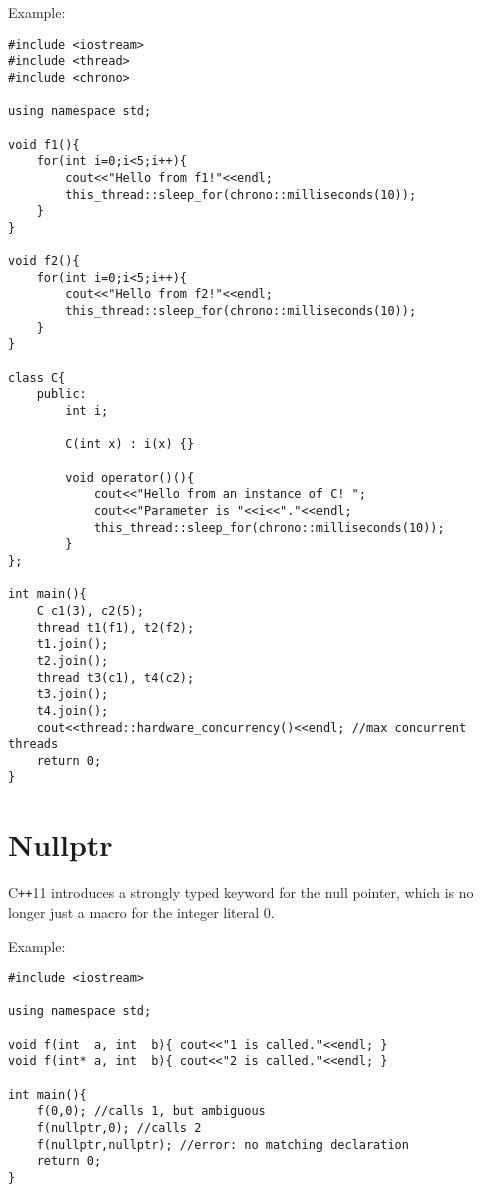 \documentclass[12pt,a4paper]{article}
\begin{document}
Example:
\vspace{10pt}
\lstset{style=CPP_CODE}
\begin{lstlisting}
#include <iostream>
#include <thread>
#include <chrono>

using namespace std;

void f1(){
    for(int i=0;i<5;i++){
        cout<<"Hello from f1!"<<endl;
        this_thread::sleep_for(chrono::milliseconds(10));
    }
}

void f2(){
    for(int i=0;i<5;i++){
        cout<<"Hello from f2!"<<endl;
        this_thread::sleep_for(chrono::milliseconds(10));
    }
}

class C{
    public:
        int i;

        C(int x) : i(x) {}

        void operator()(){
            cout<<"Hello from an instance of C! ";
            cout<<"Parameter is "<<i<<"."<<endl;
            this_thread::sleep_for(chrono::milliseconds(10));
        }
};

int main(){
    C c1(3), c2(5);
    thread t1(f1), t2(f2);
    t1.join();
    t2.join();
    thread t3(c1), t4(c2);
    t3.join();
    t4.join();
    cout<<thread::hardware_concurrency()<<endl; //max concurrent threads
    return 0;
}
\end{lstlisting}


\section{Nullptr}

C\texttt{++}11 introduces a strongly typed keyword for the null pointer, which is no longer just a macro for the integer literal 0.

Example:
\vspace{10pt}
\lstset{style=CPP_CODE}
\begin{lstlisting}
#include <iostream>

using namespace std;

void f(int  a, int  b){ cout<<"1 is called."<<endl; }
void f(int* a, int  b){ cout<<"2 is called."<<endl; }

int main(){
	f(0,0); //calls 1, but ambiguous
	f(nullptr,0); //calls 2
	f(nullptr,nullptr); //error: no matching declaration
	return 0;
}
\end{lstlisting}

\clearpage
\end{document}
